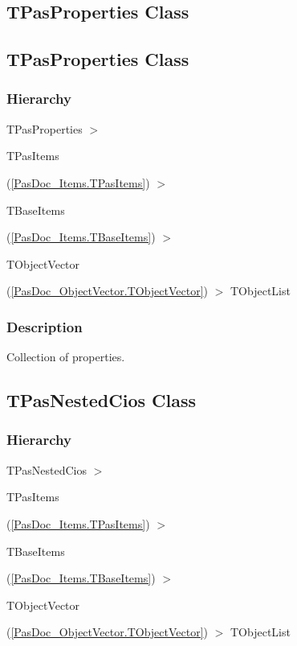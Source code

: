 \documentclass{report}
\newif\ifpdf
\begin{document}
\subsection*{\large{\textbf{TPasProperties Class}}\normalsize\hspace{1ex}\hrulefill}
\else
\subsection*{TPasProperties Class}
\fi
\label{PasDoc_Items.TPasProperties}
\subsubsection*{\large{\textbf{Hierarchy}}\normalsize\hspace{1ex}\hfill}
TPasProperties {$>$} \begin{ttfamily}TPasItems\end{ttfamily}(\ref{PasDoc_Items.TPasItems}) {$>$} \begin{ttfamily}TBaseItems\end{ttfamily}(\ref{PasDoc_Items.TBaseItems}) {$>$} \begin{ttfamily}TObjectVector\end{ttfamily}(\ref{PasDoc_ObjectVector.TObjectVector}) {$>$} 
TObjectList
\subsubsection*{\large{\textbf{Description}}\normalsize\hspace{1ex}\hfill}
Collection of properties.\ifpdf
\subsection*{\large{\textbf{TPasNestedCios Class}}\normalsize\hspace{1ex}\hrulefill}
\else
\subsection*{TPasNestedCios Class}
\fi
\label{PasDoc_Items.TPasNestedCios}
\subsubsection*{\large{\textbf{Hierarchy}}\normalsize\hspace{1ex}\hfill}
TPasNestedCios {$>$} \begin{ttfamily}TPasItems\end{ttfamily}(\ref{PasDoc_Items.TPasItems}) {$>$} \begin{ttfamily}TBaseItems\end{ttfamily}(\ref{PasDoc_Items.TBaseItems}) {$>$} \begin{ttfamily}TObjectVector\end{ttfamily}(\ref{PasDoc_ObjectVector.TObjectVector}) {$>$} 
TObjectList
\end{document}
